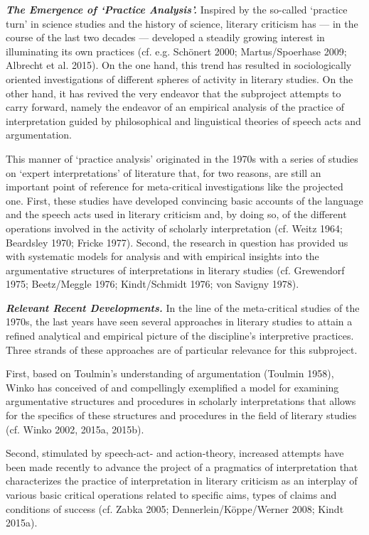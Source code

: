 \noindent \textbf{\emph{The Emergence of `Practice Analysis'.}} Inspired by the so-called `practice turn' in science studies and the history of science, literary criticism has --- in the course of the last two decades --- developed a steadily growing interest in illuminating its own practices (cf. e.g. Sch\"onert 2000; Martus/Spoerhase 2009; Albrecht et al. 2015). On the one hand, this trend has resulted in sociologically oriented investigations of different spheres of activity in literary studies. On the other hand, it has revived the very endeavor that the subproject attempts to carry forward, namely the endeavor of an empirical analysis of the practice of interpretation guided by philosophical and linguistical theories of speech acts and argumentation. 

This manner of `practice analysis' originated in the 1970s with a series of studies on `expert interpretations' of literature that, for two reasons, are still an important point of reference for meta-critical investigations like the projected one. First, these studies have developed convincing basic accounts of the language and the speech acts used in literary criticism and, by doing so, of the different operations involved in the activity of scholarly interpretation (cf. Weitz 1964; Beardsley 1970; Fricke 1977). Second, the research in question has provided us with systematic models for analysis and with empirical insights into the argumentative structures of interpretations in literary studies (cf. Grewendorf 1975; Beetz/Meggle 1976; Kindt/Schmidt 1976; von Savigny 1978). 

\vspace{.2cm}
\noindent \textbf{\emph{Relevant Recent Developments.}} In the line of the meta-critical studies of the 1970s, the last years have seen several approaches in literary studies to attain a refined analytical and empirical picture of the discipline's interpretive practices. Three strands of these approaches are of particular relevance for this subproject. 

First, based on Toulmin's understanding of argumentation (Toulmin 1958), Winko has conceived of and compellingly exemplified a model for examining argumentative structures and procedures in scholarly interpretations that allows for the specifics of these structures and procedures in the field of literary studies (cf. Winko 2002, 2015a, 2015b).

Second, stimulated by speech-act- and action-theory, increased attempts have been made recently to advance the project of a pragmatics of interpretation that characterizes the practice of interpretation in literary criticism as an interplay of various basic critical operations related to specific aims, types of claims and conditions of success (cf. Zabka 2005; Dennerlein/K\"oppe/Werner 2008; Kindt 2015a). 

